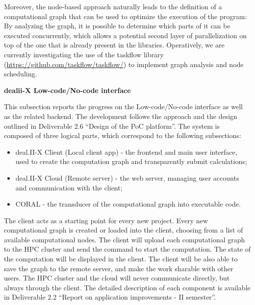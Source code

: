 \documentclass[a4paper,12pt, numbers]{article}
\begin{document}
Moreover, the node-based approach naturally leads to the definition of a computational graph that can be used to optimize the execution of the program: By analyzing the graph, it is possible to determine which parts of it can be executed concurrently, which allows a potential second layer of parallelization on top of the one that is already present in the libraries. Operatively, we are currently investigating the use of the taskflow library (\href{https://github.com/taskflow/taskflow}{https://github.com/taskflow/taskflow/}) to implement graph analysis and node scheduling.   


\noindent\textbf{dealii-X Low-code/No-code interface}

This subsection reports the progress on the Low-code/No-code interface as well as the related backend. The development follows the approach and the design outlined in Deliverable 2.6 ``Design of the PoC platform''. The system is composed of three logical parts, which correspond to the following subsections:
\begin{itemize}
\item deal.II-X Client (Local client app) - the frontend and main user interface, used to create the computation graph and transparently submit calculations;
\item deal.II-X Cloud (Remote server) - the web server, managing user accounts and communication with the client;
\item CORAL - the transducer of the computational graph into executable code.
\end{itemize}


The client acts as a starting point for every new project. Every new computational graph is created or loaded into the client, choosing from a list of available computational nodes. The client will upload each computational graph to the HPC cluster and send the command to start the computation. The state of the computation will be displayed in the client. The client will be also able to save the graph to the remote server, and make the work sharable with other users. The HPC cluster and the cloud will never communicate directly, but always through the client. The detailed description of each component is available in Deliverable 2.2 ``Report on application improvements - II semester''.
\end{document}
